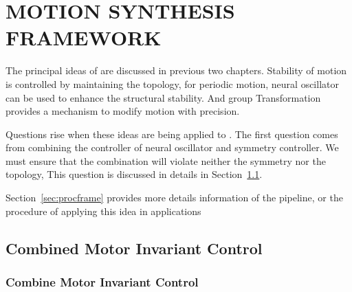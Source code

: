 \chapter {MOTION SYNTHESIS FRAMEWORK}
\label{chap:msf}
\graphicspath{{CombineFramework/CombineFrameworkFigs/EPS/}{CombineFramework/CombineFrameworkFigs/}}
The principal ideas of \moit are discussed in previous two chapters.
Stability of motion is controlled by maintaining the topology, 
for periodic motion, neural oscillator can be used to enhance the structural stability.
And group Transformation provides a mechanism to modify motion with precision.


Questions rise when these ideas are being applied  to \cms.
The first question comes from combining the controller of neural oscillator and symmetry controller.
We must ensure that the combination will violate neither the symmetry nor the topology,
This question is discussed in details in Section~\ref{sec:combin}.


Section~\ref{sec:procframe} provides more details information of the pipeline, or the procedure of applying this idea in \cms applications

%
%
%
%

\section{Combined Motor Invariant Control}
\label{sec:combin}
\subsection{ Combine Motor Invariant Control}

